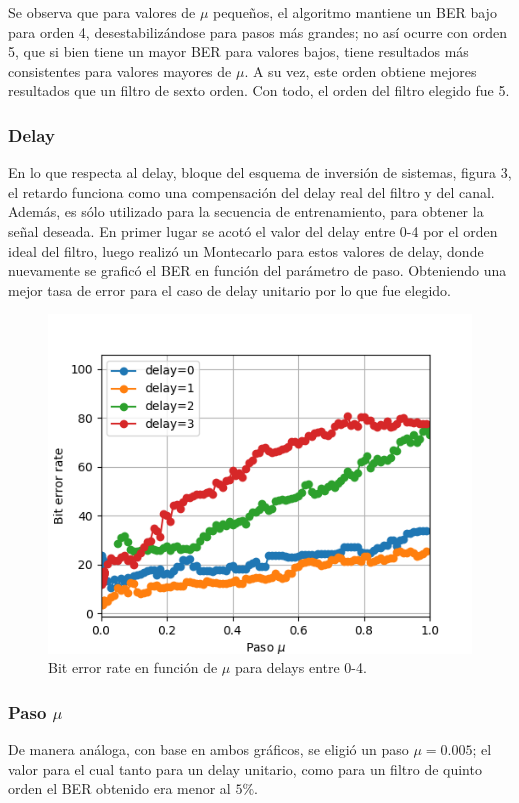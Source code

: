 \documentclass[main.tex]{subfiles}
\begin{document}
Se observa que para valores de $\mu$ pequeños, el algoritmo mantiene un BER bajo 
para orden 4, desestabilizándose para pasos más grandes; no así ocurre con orden 5, 
que si bien tiene un mayor BER para valores bajos, tiene resultados más consistentes
para valores mayores de $\mu$. A su vez, este orden obtiene mejores resultados que un 
filtro de sexto orden. Con todo, el orden del filtro elegido fue 5.

\subsubsection*{Delay}
En lo que respecta al delay, bloque del esquema de inversión de sistemas, 
figura 3,
 el retardo funciona como una compensación del delay real
del filtro y del canal. Además, es sólo utilizado para la secuencia de entrenamiento, para obtener la señal deseada.
En primer lugar se acotó el valor del delay entre 0-4 por el orden ideal del filtro, 
luego realizó un Montecarlo para estos valores de delay, donde nuevamente se
graficó el BER en función del parámetro de paso. Obteniendo una mejor tasa de error 
para el caso de delay unitario por lo que fue elegido.
\begin{figure}[H]
    \centering
    \includegraphics[scale=0.6]{imagenes/delay.png}
    \caption{Bit error rate en función de $\mu$ para delays entre 0-4.}
\end{figure}

\subsubsection*{Paso $\mu$}
De manera análoga, con base en ambos gráficos, se eligió un paso $\mu=0.005$; el valor
para el cual tanto para un  delay unitario, como para un filtro de quinto orden
el BER obtenido era menor al $5\%$.
\end{document}
